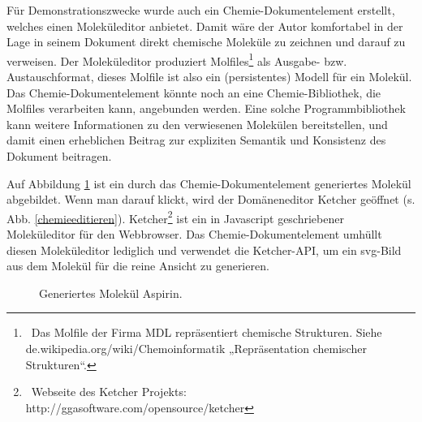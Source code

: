 Für Demonstrationszwecke wurde auch ein Chemie-Dokumentelement erstellt, welches einen Moleküleditor anbietet. Damit wäre der Autor komfortabel in der Lage in seinem Dokument direkt chemische Moleküle zu zeichnen und darauf zu verweisen. Der Moleküleditor produziert Molfiles\footnote{~Das Molfile der Firma MDL repräsentiert chemische Strukturen. Siehe de.wikipedia.org/wiki/Chemoinformatik „Repräsentation chemischer Strukturen“.} als Ausgabe- bzw. Austauschformat, dieses Molfile ist also ein (persistentes) Modell für ein Molekül. Das Chemie-Dokumentelement könnte noch an eine Chemie-Bibliothek, die Molfiles verarbeiten kann, angebunden werden. Eine solche Programmbibliothek kann weitere Informationen zu den verwiesenen Molekülen bereitstellen, und damit einen erheblichen Beitrag zur expliziten Semantik und Konsistenz des Dokument beitragen.

 
Auf Abbildung \ref{Aspirin} ist ein durch das Chemie-Dokumentelement generiertes Molekül abgebildet. Wenn man darauf klickt, wird der Domäneneditor Ketcher geöffnet (s. Abb. \ref{chemieeditieren}). Ketcher\footnote{~Webseite des Ketcher Projekts: http://ggasoftware.com/opensource/ketcher} ist ein in Javascript geschriebener Moleküleditor für den Webbrowser. Das Chemie-Dokumentelement umhüllt diesen Moleküleditor lediglich und verwendet die Ketcher-API, um ein svg-Bild aus dem Molekül für die reine Ansicht zu generieren.

 
\begin{figure}[h!]
\centering
\advance\leftskip-2.5cm
\caption{ Generiertes Molekül Aspirin. }\label{Aspirin}
\end{figure}
 
